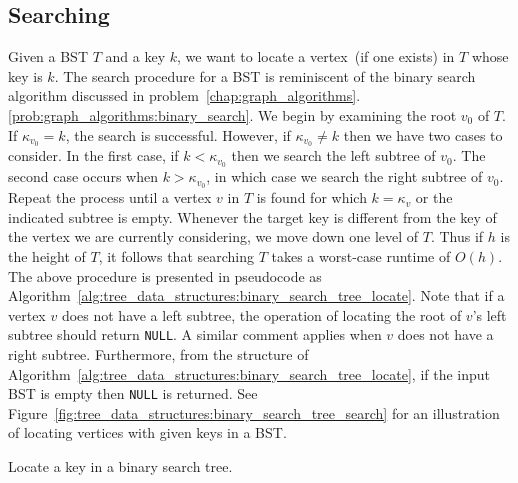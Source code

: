 
\subsection{Searching}

Given a BST $T$ and a key $k$, we want to locate a vertex~(if one
exists) in $T$ whose key is $k$. The search procedure for a BST is
reminiscent of the binary search algorithm
discussed in
problem~\ref{chap:graph_algorithms}.\ref{prob:graph_algorithms:binary_search}.
We begin by examining the root $v_0$ of $T$. If $\kappa_{v_0} = k$,
the search is successful. However, if $\kappa_{v_0} \neq k$ then we
have two cases to consider. In the first case, if $k < \kappa_{v_0}$
then we search the left subtree of $v_0$. The second case occurs when
$k > \kappa_{v_0}$, in which case we search the right subtree of
$v_0$. Repeat the process until a vertex $v$ in $T$ is found for which
$k = \kappa_v$ or the indicated subtree is empty. Whenever the target
key is different from the key of the vertex we are currently
considering, we move down one level of $T$. Thus if $h$ is the height
of $T$, it follows that searching $T$ takes a worst-case runtime of
$O(h)$. The above procedure is presented in pseudocode as
Algorithm~\ref{alg:tree_data_structures:binary_search_tree_locate}. Note
that if a vertex $v$ does not have a left subtree, the operation of
locating the root of $v$'s left subtree should return \texttt{NULL}. A
similar comment applies when $v$ does not have a right
subtree. Furthermore, from the structure of
Algorithm~\ref{alg:tree_data_structures:binary_search_tree_locate}, if
the input BST is empty then \texttt{NULL} is returned. See
Figure~\ref{fig:tree_data_structures:binary_search_tree_search} for an
illustration of locating vertices with given keys in a BST.

\begin{algorithm}[!htbp]

\caption{Locate a key in a binary search tree.}
\label{alg:tree_data_structures:binary_search_tree_locate}
\end{algorithm}

